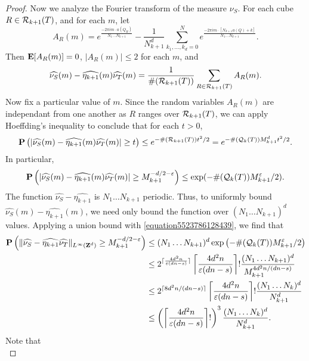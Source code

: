 \begin{proof}
    Now we analyze the Fourier transform of the measure $\nu_S$. For each cube $R \in \operatorname{\mathcal{R}}_{k+1}(T)$, and for each $m$, let
    \[ A_R(m) = e^{\frac{-2 \pi i m \cdot a(Q_R)}{N_1 \dots N_{k+1}}} - \frac{1}{N_{k+1}^d} \sum_{k_1, \dots, k_d = 0}^N e^{\frac{-2 \pi i m \cdot [N_{k+1} a(Q) + k]}{N_1 \dots N_{k+1}}}. \]
    Then $\operatorname{\mathbf{E}}[A_R(m)] = 0$, $|A_R(m)| \leq 2$ for each $m$, and
    \[ \widehat{\nu_S}(m) - \widehat{\eta_{k+1}}(m) \widehat{\nu_T}(m) = \frac{1}{\#(\operatorname{\mathcal{R}}_{k+1}(T))} \sum_{R \in \operatorname{\mathcal{R}}_{k+1}(T)} A_R(m). \]
    Now fix a particular value of $m$. Since the random variables $A_R(m)$ are independant from one another as $R$ ranges over $\operatorname{\mathcal{R}}_{k+1}(T)$, we can apply Hoeffding's inequality to conclude that for each $t > 0$,
    \[ \operatorname{\mathbf{P}} \left( |\widehat{\nu_S}(m) - \widehat{\eta_{k+1}}(m) \widehat{\nu_T}(m)| \geq t \right) \leq e^{-\#(\operatorname{\mathcal{R}}_{k+1}(T)) t^2/2} = e^{-\#(\operatorname{\mathcal{Q}}_k(T)) M_{k+1}^d t^2/2}. \]
    In particular,
    \[ \operatorname{\mathbf{P}} \left( |\widehat{\nu_S}(m) - \widehat{\eta_{k+1}}(m) \widehat{\nu_T}(m)| \geq M_{k+1}^{-d/2 - \varepsilon} \right) \leq \exp(- \#(\operatorname{\mathcal{Q}}_k(T)) M_{k+1}^\varepsilon / 2 ). \]
    The function $\widehat{\nu_S} - \widehat{\eta_{k+1}}$ is $N_1 \dots N_{k+1}$ periodic. Thus, to uniformly bound $\widehat{\nu_S}(m) - \widehat{\eta_{k+1}}(m)$, we need only bound the function over $(N_1 \dots N_{k+1})^d$ values. Applying a union bound with \eqref{equation5523786128439}, we find that
    \begin{equation} \label{equation81298398120412}
    \begin{split}
        \operatorname{\mathbf{P}} \left( \| \widehat{\nu_S} - \widehat{\eta_{k+1}} \widehat{\nu_T} \|_{L^\infty(\operatorname{\mathbf{Z}}^d)} \geq M_{k+1}^{- d/2 - \varepsilon} \right) &\leq (N_1 \dots N_{k+1})^d \exp \left( - \#(\operatorname{\mathcal{Q}}_k(T)) M_{k+1}^\varepsilon / 2 \right)\\
        &\leq 2^{\lceil \frac{4d^2n}{\varepsilon(dn - s)} \rceil} \left\lceil \frac{4d^2n}{\varepsilon(dn-s)} \right\rceil! \frac{(N_1 \dots N_{k+1})^d}{M_{k+1}^{4d^2n/(dn - s)}}\\
        &\leq 2^{\lceil 8d^2n/(dn - s) \rceil} \left\lceil \frac{4d^2n}{\varepsilon(dn-s)} \right\rceil! \frac{(N_1 \dots N_k)^d}{N_{k+1}^d}\\
        &\leq \left( \left\lceil \frac{4d^2n}{\varepsilon(dn-s)} \right\rceil! \right)^3 \frac{(N_1 \dots N_k)^d}{N_{k+1}^d}.
    \end{split}
    \end{equation}
    Note that
    \begin{equation} \label{equation8998724714871}

\end{equation}
\end{proof}
